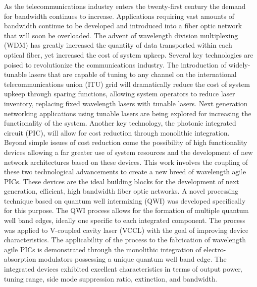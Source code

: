 \documentclass[oneside]{ZJUthesis}
\begin{document}
\begin{englishabstract}
As the telecommunications industry enters the twenty-first century the demand for bandwidth continues to increase. Applications requiring vast amounts of bandwidth continue to be developed and introduced into a fiber optic network that will soon be overloaded. The advent of wavelength division multiplexing (WDM) has greatly increased the quantity of data transported within each optical fiber, yet increased the cost of system upkeep. Several key technologies are poised to revolutionize the communications industry. The introduction of widely-tunable lasers that are capable of tuning to any channel on the international telecommunications union (ITU) grid will dramatically reduce the cost of system upkeep through sparing functions, allowing system operators to reduce laser inventory, replacing fixed wavelength lasers with tunable lasers. Next generation networking applications using tunable lasers are being explored for increasing the functionality of the system. Another key technology, the photonic integrated circuit (PIC), will allow for cost reduction through monolithic integration. Beyond simple issues of cost reduction come the possibility of high functionality devices allowing a far greater use of system resources and the development of new network architectures based on these devices. This work involves the coupling of these two technological advancements to create a new breed of wavelength agile PICs. These devices are the ideal building blocks for the development of next generation, efficient, high bandwidth fiber optic networks. A novel processing technique based on quantum well intermixing (QWI) was developed specifically for this purpose. The QWI process allows for the formation of multiple quantum well band edges, ideally one specific to each integrated component. The process was applied to V-coupled cavity laser (VCCL) with the goal of improving device characteristics. The applicability of the process to the fabrication of wavelength agile PICs is demonstrated through the monolithic integration of electro-absorption modulators possessing a unique quantum well band edge. The integrated devices exhibited excellent characteristics in terms of output power, tuning range, side mode suppression ratio, extinction, and bandwidth.

\end{englishabstract}
\end{document}
